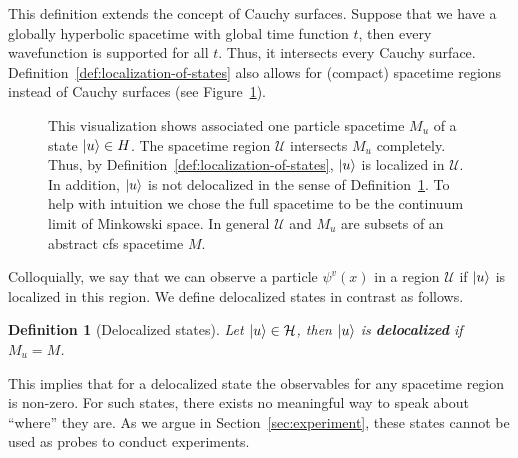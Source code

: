 \documentclass[reqno,11pt]{amsart}
\DeclareMathOperator{\supp}{supp}
\renewcommand{\H}{\mathcal{H}}
\newtheorem{definition}{Definition}[section]
\numberwithin{equation}{section}
\begin{document}
This definition extends the concept of Cauchy surfaces.
Suppose that we have a globally hyperbolic spacetime with global time function $t$, then every wavefunction
is supported for all $t$.
Thus, it intersects every Cauchy surface.
Definition~\ref{def:localization-of-states} also allows for (compact) spacetime regions instead of Cauchy surfaces (see Figure~\ref{fig:localized-state}).


\begin{figure}
    \label{fig:localized-state}
    
    \caption{
        This visualization shows associated one particle spacetime $M_u$ of a state $\ket{u} \in H$.
        The spacetime region $\mathcal{U}$ intersects $M_u$ completely.
        Thus, by Definition~\ref{def:localization-of-states}, $\ket{u}$ is localized in $\mathcal{U}$.
        In addition, $\ket{u}$ is not delocalized in the sense of Definition~\ref{def:delocalized-states}. To help with intuition we chose the full spacetime to be the continuum limit of Minkowski space. In general $\mathcal{U}$ and $M_u$ are subsets of an abstract \ac{cfs} spacetime $M$.
    }
\end{figure}

Colloquially, we say that we can observe a particle $\psi^{v}(x)$ in a region $\mathcal{U}$ if $\ket{u}$ is localized in this region.
We define delocalized states in contrast as follows.
\begin{definition}[Delocalized states]\label{def:delocalized-states}
    Let $\ket{u} \in \H$, then $\ket{u}$ is \textbf{delocalized} if $M_u = M$.
\end{definition}
This implies that for a delocalized state the observables for any spacetime region is non-zero.
For such states, there exists no meaningful way to speak about ``where'' they are.
As we argue in Section~\ref{sec:experiment}, these states cannot be used as probes to conduct experiments.
\end{document}
